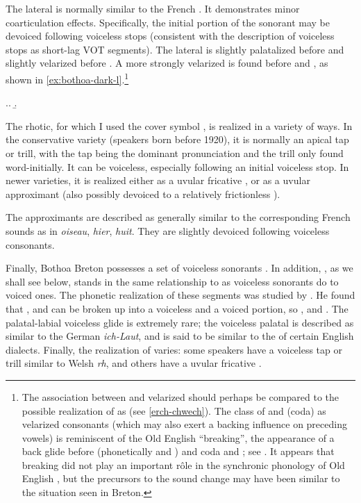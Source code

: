 The lateral \ipa{[l]} is normally similar to the French \ipa{[l]}. It demonstrates minor coarticulation effects. Specifically, the initial portion of the sonorant may be devoiced following voiceless stops (consistent with the description of voiceless stops as short-lag VOT segments). The lateral is slightly palatalized before \ipa{[i]} and slightly velarized before \ipa{[u]}. A more strongly velarized \ipa{[ɫ]} is found before  and , as shown in \cref{ex:bothoa-dark-l}.\footnote{The association between \ipa{[h]} and velarized  should perhaps be compared to the possible realization of \ipa{[rh]} as  (see \cref{erch-chwech}). The class of \ipa{[h]} and (coda) \ipa{[l~r]} as velarized consonants (which may also exert a backing influence on preceding vowels) is reminiscent of the Old English \enquote{breaking}, \ie the appearance of a back glide before \ipa{[h]} (phonetically  and ) and coda \ipa{[l]} and \ipa{[r]}; see \citet[§§5.16]{hogg92:_old_englis}. It appears that breaking did not play an important rôle in the synchronic phonology of Old English \citep[§5.32]{hogg92:_old_englis}, but the precursors to the sound change may have been similar to the situation seen in Breton.}

\ex.\label{ex:bothoa-dark-l}\a.
\b.

The rhotic, for which I used the cover symbol \ipa{[r]}, is realized in a variety of ways. In the conservative variety (speakers born before 1920), it is normally an apical tap or trill, with the tap being the dominant pronunciation and the trill only found word-initially. It can be voiceless, especially following an initial voiceless stop. In newer varieties, it is realized either as a uvular fricative \ipa{[ʁ]}, or as a uvular approximant \ipa{[ʁ̞]} (also possibly devoiced to a relatively frictionless \ipa{[χ̞]}).

The approximants \ipa{[w~j~ɥ]} are described as generally similar to the corresponding French sounds as in \emph{oiseau}, \emph{hier}, \emph{huit}. They are slightly devoiced following voiceless consonants.

Finally, Bothoa Breton possesses a set of voiceless sonorants \ipa{[m̥~n̥~l̥~r̥~w̥~ɥ̊]}. In addition, \ipa{[ç]}, as we shall see below, stands in the same relationship to \ipa{[j]} as voiceless sonorants do to voiced ones. The phonetic realization of these segments was studied by \citet{humphreys}. He found that \ipa{[m̥]}, \ipa{[n̥]} and \ipa{[l̥]} can be broken up into a voiceless and a voiced portion, so ,  and . The palatal-labial voiceless glide \ipa{[ɥ̊]} is extremely rare; the voiceless palatal \ipa{[ç]} is described as similar to the German \emph{ich-Laut}, and \ipa{[w̥]} is said to be similar to the \ipa{[ʍ]} of certain English dialects. Finally, the realization of \ipa{[r̥]} varies: some speakers have a voiceless tap or trill  similar to Welsh \emph{rh}, and others have a uvular fricative .

